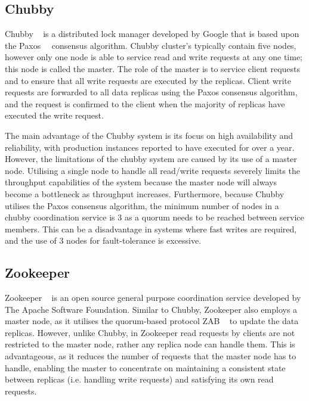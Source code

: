 	\subsection{Chubby}
	Chubby ~\cite{Burrows:2006:CLS:1298455.1298487} is a distributed lock manager developed by Google that is based upon the Paxos~\cite{Lamport:1998:PP:279227.279229}~\cite{Lamport:2001:PaxosMadeSimple} consensus algorithm. Chubby cluster's typically contain five nodes, however only one node is able to service read and write requests at any one time; this node is called the master. The role of the master is to service client requests and to ensure that all write requests are executed by the replicas. Client write requests are forwarded to all data replicas using the Paxos consensus algorithm, and the request is confirmed to the client when the majority of replicas have executed the write request. 

The main advantage of the Chubby system is its focus on high availability and reliability, with production instances reported to have executed for over a year. However, the limitations of the chubby system are caused by its use of a master node. Utilising a single node to handle all read/write requests severely limits the throughput capabilities of the system because the master node will always become a bottleneck as throughput increases.  Furthermore, because Chubby utilises the Paxos consensus algorithm, the minimum number of nodes in a chubby coordination service is 3 as a quorum needs to be reached between service members.  This can be a disadvantage in systems where fast writes are required, and the use of 3 nodes for fault-tolerance is excessive.  

	\subsection{Zookeeper}
	Zookeeper ~\cite{Hunt:2010:ZWC:1855840.1855851} is an open source general purpose coordination service developed by The Apache Software Foundation. Similar to Chubby, Zookeeper also employs a master node, as it utilises the quorum-based protocol ZAB ~\cite{Junqueira:2011:ZHB:2056308.2056409} to update the data replicas.  However, unlike Chubby, in Zookeeper read requests by clients are not restricted to the master node, rather any replica node can handle them.  This is advantageous, as it reduces the number of requests that the master node has to handle, enabling the master to concentrate on maintaining a consistent state between replicas (i.e. handling write requests) and satisfying its own read requests.  
	
